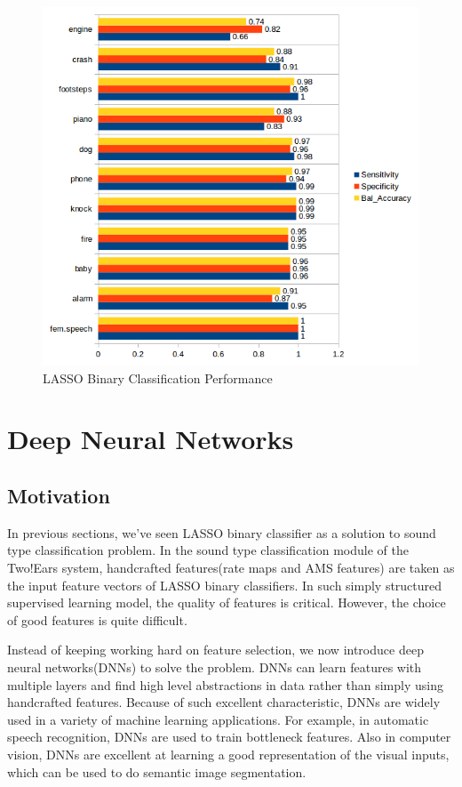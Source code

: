 \begin{figure}[h!]
\caption{LASSO Binary Classification Performance}
\label{fig:lassclf}
\includegraphics{../image/chapter1/LASSO_results.png}
\end{figure}

\section{Deep Neural Networks}
\label{sec:deepNN}
\subsection{Motivation}
In previous sections, we've seen LASSO binary classifier as a solution to sound type classification problem. In the sound type classification module of the Two!Ears system, handcrafted features(rate maps and AMS features) are taken as the input feature vectors of LASSO binary classifiers. In such simply structured supervised learning model, the quality of features is critical. However, the choice of good features is quite difficult. 

Instead of keeping working hard on feature selection, we now introduce deep neural networks(DNNs) to solve the problem. DNNs can learn features with multiple layers and find high level abstractions in data rather than simply using handcrafted features. Because of such excellent characteristic, DNNs are widely used in a variety of machine learning applications. For example, in automatic speech recognition, DNNs are used to train bottleneck features\cite{zhang2014extracting}. Also in computer vision, DNNs are excellent at learning a good representation of the visual inputs, which can be used to do semantic image segmentation\cite{krizhevsky2012imagenet}. 
